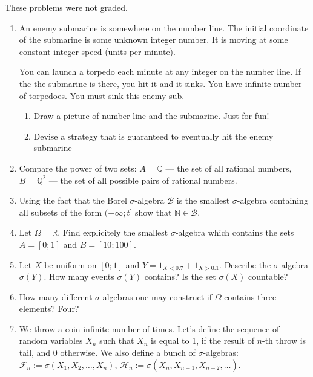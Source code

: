 \documentclass[12pt, a4paper]{article}
\newcommand{\cF}{\mathcal{F}}
\begin{document}
These problems were not graded.

\begin{enumerate}
\item  An enemy submarine is somewhere on the number line. The initial coordinate of the submarine is some unknown integer number. It is moving at some constant integer speed (units per minute).

You can launch a torpedo each minute at any integer on the number line. If the the submarine is there, you hit it and it sinks. You have infinite number of torpedoes. You must sink this enemy sub.
\begin{enumerate}
\item Draw a picture of number line and the submarine. Just for fun!
\item Devise a strategy that is guaranteed to eventually hit the enemy submarine
\end{enumerate}

\item Compare the power of two sets: $A=\mathbb{Q}$ — the set of all rational numbers, $B=\mathbb{Q}^2$ — the set of all possible pairs of rational numbers.

\item Using the fact that the Borel $\sigma$-algebra $\mathcal{B}$ is the smallest $\sigma$-algebra containing all subsets of the form $(-\infty; t]$ show that $\mathbb{N}\in \mathcal{B}$.

\item Let $\Omega=\mathbb{R}$. Find explicitely the smallest $\sigma$-algebra which contains the sets $A=[0;1]$ and $B=[10;100]$.

\item Let $X$ be uniform on $[0;1]$ and $Y=1_{X<0.7}+1_{X>0.1}$. Describe the $\sigma$-algebra $\sigma(Y)$. How many events  $\sigma(Y)$ contains? Is the set $\sigma(X)$ countable?

\item How many different $\sigma$-algebras one may construct if $\Omega$ contains three elements? Four?

\item We throw a coin infinite number of times. Let's define the sequence of random variables $X_n$ such that  $X_{n}$ is equal to 1, if the result of $n$-th throw is tail, and 0 otherwise. We also define a bunch of $ \sigma $-algebras: $\cF_{n}:=\sigma(X_{1}, X_{2}, \ldots, X_{n})$, $\mathcal{H}_{n}:=\sigma(X_{n},X_{n+1},X_{n+2},\ldots)$.


\end{enumerate}
\end{document}
